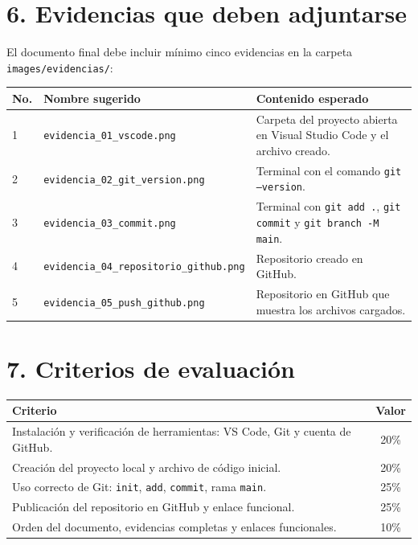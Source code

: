 \documentclass[12pt,onecolumn]{article}
\begin{document}
\section*{6. Evidencias que deben adjuntarse}
El documento final debe incluir mínimo cinco evidencias en la carpeta \texttt{images/evidencias/}:

\begin{table}[H]
\centering
\small
\begin{tabularx}{\textwidth}{p{0.5cm}X p{6cm}}
\toprule
\textbf{No.} & \textbf{Nombre sugerido} & \textbf{Contenido esperado} \\
\midrule
1 & \texttt{evidencia\_01\_vscode.png} & Carpeta del proyecto abierta en Visual Studio Code y el archivo creado. \\
2 & \texttt{evidencia\_02\_git\_version.png} & Terminal con el comando \texttt{git --version}. \\
3 & \texttt{evidencia\_03\_commit.png} & Terminal con \texttt{git add .}, \texttt{git commit} y \texttt{git branch -M main}. \\
4 & \texttt{evidencia\_04\_repositorio\_github.png} & Repositorio creado en GitHub. \\
5 & \texttt{evidencia\_05\_push\_github.png} & Repositorio en GitHub que muestra los archivos cargados. \\
\bottomrule
\end{tabularx}
\end{table}

\section*{7. Criterios de evaluación}

\begin{table}[H]
\centering
\small
\begin{tabularx}{\textwidth}{Xc}
\toprule
\textbf{Criterio} & \textbf{Valor} \\
\midrule
Instalación y verificación de herramientas: VS Code, Git y cuenta de GitHub. & 20\% \\
Creación del proyecto local y archivo de código inicial. & 20\% \\
Uso correcto de Git: \texttt{init}, \texttt{add}, \texttt{commit}, rama \texttt{main}. & 25\% \\
Publicación del repositorio en GitHub y enlace funcional. & 25\% \\
Orden del documento, evidencias completas y enlaces funcionales. & 10\% \\
\bottomrule
\end{tabularx}
\end{table}
\end{document}
